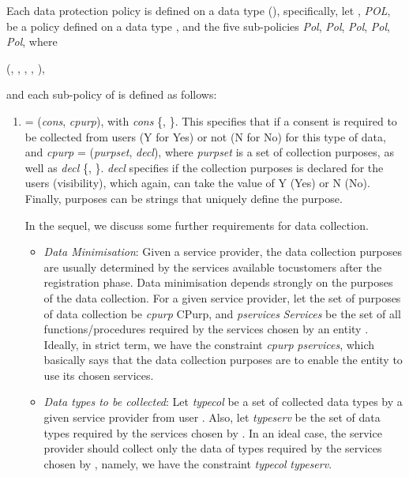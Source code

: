 \documentclass[a4paper]{article}
\begin{document}
Each data protection policy is defined on a data type (), specifically, let ,   \textit{POL}, be a policy defined on a data type , and the five sub-policies   \textit{Pol},   \textit{Pol},   \textit{Pol},   \textit{Pol},   \textit{Pol}, where  

\begin{center}
  (, , , , ),   
\end{center} 
 
and each sub-policy of  is defined as follows: 
 
\begin{enumerate}
\item  = (\textit{cons}, \textit{cpurp}), with \textit{cons}  \{, \}. This specifies that if a consent is required to be collected from users (Y for Yes) or not (N for No) for this type of data, and \textit{cpurp} = (\textit{purpset}, \textit{decl}), where \textit{purpset} is a set of collection purposes, as well as \textit{decl}  \{, \}. \textit{decl} specifies if the collection purposes is declared for the users (visibility), which again, can take the value of Y (Yes) or N (No). Finally, purposes can be strings that uniquely define the purpose.  

In the sequel, we discuss some further requirements for data collection.     
 
\begin{itemize}
\item \textit{Data Minimisation}: Given a service provider, the data collection purposes are usually determined by the services available tocustomers after the registration phase.   
Data minimisation depends strongly on the purposes of the data collection. For a given service provider, let the set of purposes of data collection be \textit{cpurp}  CPurp, and \textit{pservices}  \textit{Services} be the set of all functions/procedures required by the services chosen by an entity . Ideally, in strict term, we have the constraint \textit{cpurp}  \textit{pservices}, which basically says that the data collection purposes are to enable the entity  to use its chosen services.       

\item \textit{Data types to be collected}: Let \textit{typecol} be a set of collected data types by a given service provider from user . Also, let \textit{typeserv} be the set of data types required by the services chosen by . In an ideal case, the service provider should collect only the data of types required by the services chosen by , namely, we have the constraint \textit{typecol}  \textit{typeserv}.


\end{itemize}
\end{enumerate}
\end{document}
